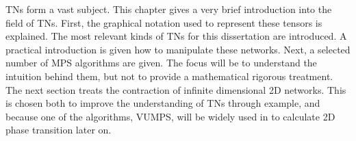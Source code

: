 \Glspl{TN} form a vast subject. This chapter gives a very brief introduction into the field of \Glspl{TN}. First, the graphical notation used to represent these tensors is explained. The most relevant kinds of \Glspl{TN} for this dissertation are introduced. A practical introduction is given how to manipulate these networks. Next, a selected number of \gls{MPS} algorithms are given. The focus will be to understand the intuition behind them, but not to  provide a mathematical rigorous treatment. The next section treats the contraction of infinite dimensional 2D networks. This is chosen both to improve the understanding of \Glspl{TN} through example, and because one of the algorithms, \gls{VUMPS}, will be widely used in to calculate 2D phase transition later on.